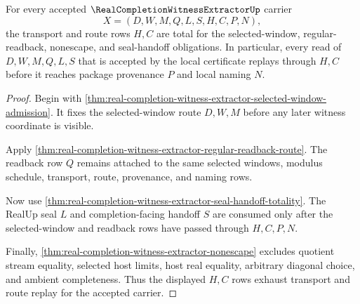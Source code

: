 \begin{theorem}
\label{thm:real-completion-witness-extractor-transport-totality}
For every accepted $\RealCompletionWitnessExtractorUp$ carrier
$$
X=(D,W,M,Q,L,S,H,C,P,N),
$$
the transport and route rows $H,C$ are total for the selected-window, regular-readback, nonescape, and seal-handoff obligations. In particular, every read of $D,W,M,Q,L,S$ that is accepted by the local certificate replays through $H,C$ before it reaches package provenance $P$ and local naming $N$.
\end{theorem}
\begin{proof}
Begin with \autoref{thm:real-completion-witness-extractor-selected-window-admission}. It fixes the selected-window route $D,W,M$ before any later witness coordinate is visible.

Apply \autoref{thm:real-completion-witness-extractor-regular-readback-route}. The readback row $Q$ remains attached to the same selected windows, modulus schedule, transport, route, provenance, and naming rows.

Now use \autoref{thm:real-completion-witness-extractor-seal-handoff-totality}. The RealUp seal $L$ and completion-facing handoff $S$ are consumed only after the selected-window and readback rows have passed through $H,C,P,N$.

Finally, \autoref{thm:real-completion-witness-extractor-nonescape} excludes quotient stream equality, selected host limits, host real equality, arbitrary diagonal choice, and ambient completeness. Thus the displayed $H,C$ rows exhaust transport and route replay for the accepted carrier.
\end{proof}

